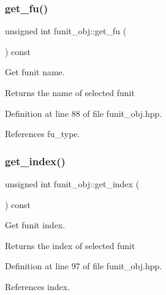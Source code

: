 \mbox{\label{classfunit__obj_a23c243f9f790d6364a4faa66443ca357}} 
\subsubsection{\texorpdfstring{get\+\_\+fu()}{get\_fu()}}
{\footnotesize\ttfamily unsigned int funit\+\_\+obj\+::get\+\_\+fu (\begin{DoxyParamCaption}{ }\end{DoxyParamCaption}) const\hspace{0.3cm}{\ttfamily [inline]}}



Get funit name. 

\begin{DoxyReturn}{Returns}
the name of selected funit 
\end{DoxyReturn}


Definition at line 88 of file funit\+\_\+obj.\+hpp.



References fu\+\_\+type.

\mbox{\label{classfunit__obj_a14871aebaa095e49bb0460e7d60c8bb3}} 
\subsubsection{\texorpdfstring{get\+\_\+index()}{get\_index()}}
{\footnotesize\ttfamily unsigned int funit\+\_\+obj\+::get\+\_\+index (\begin{DoxyParamCaption}{ }\end{DoxyParamCaption}) const\hspace{0.3cm}{\ttfamily [inline]}}



Get funit index. 

\begin{DoxyReturn}{Returns}
the index of selected funit 
\end{DoxyReturn}


Definition at line 97 of file funit\+\_\+obj.\+hpp.



References index.

